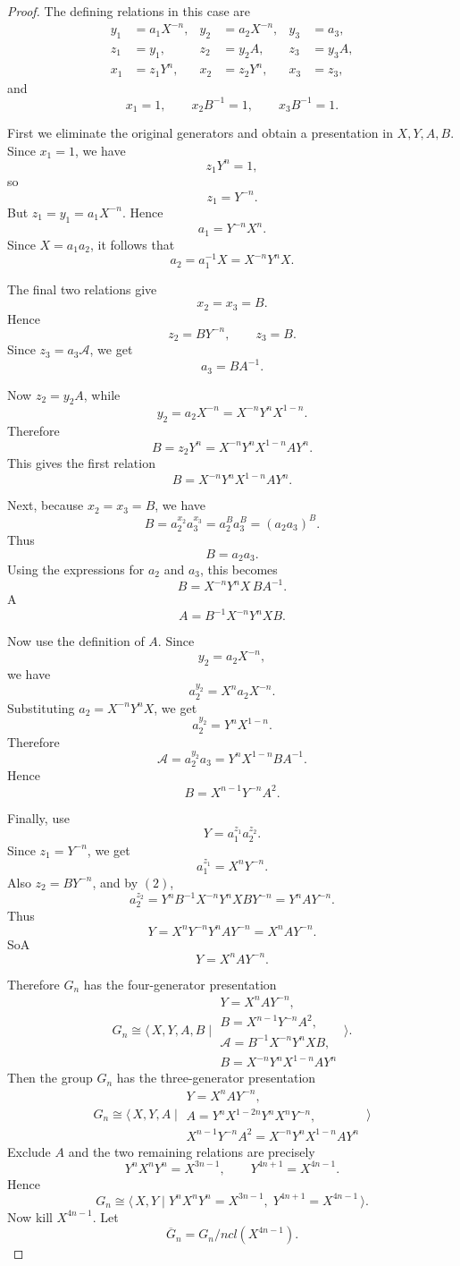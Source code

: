 \documentclass{article}
\newcommand{\gp}[2]{\langle\, #1 \mid #2 \,\rangle}
\begin{document}
\begin{proof}

The defining relations in this case are
\[
\begin{aligned}
y_1&=a_1X^{-n},& y_2&=a_2X^{-n},& y_3&=a_3,\\
z_1&=y_1,& z_2&=y_2A,& z_3&=y_3 A,\\
x_1&=z_1Y^n,& x_2&=z_2Y^n,& x_3&=z_3,
\end{aligned}
\]
and
\[
x_1=1,\qquad x_2B^{-1}=1,\qquad x_3B^{-1}=1.
\]

First we eliminate the original generators and obtain a presentation in
\(X,Y, A,B\).  Since \(x_1=1\), we have
\[
z_1Y^n=1,
\]
so
\[
z_1=Y^{-n}.
\]
But \(z_1=y_1=a_1X^{-n}\).  Hence
\[
a_1=Y^{-n}X^n.
\]
Since \(X=a_1a_2\), it follows that
\[
a_2=a_1^{-1}X=X^{-n}Y^nX.
\]

The final two relations give
\[
x_2=x_3=B.
\]
Hence
\[
z_2=BY^{-n},\qquad z_3=B.
\]
Since \(z_3=a_3\mathcal A\), we get
\[
a_3=B A^{-1}.
\]

Now \(z_2=y_2A\), while
\[
y_2=a_2X^{-n}=X^{-n}Y^nX^{1-n}.
\]
Therefore
\[
B=z_2Y^n
  =X^{-n}Y^nX^{1-n}A Y^n.
\]
This gives the first relation
\[
B=X^{-n}Y^nX^{1-n}A Y^n. \tag{1}
\]

Next, because \(x_2=x_3=B\), we have
\[
B=a_2^{x_2}a_3^{x_3}
  =a_2^B a_3^B
  =(a_2a_3)^B.
\]
Thus
\[
B=a_2a_3.
\]
Using the expressions for \(a_2\) and \(a_3\), this becomes
\[
B=X^{-n}Y^nX\,BA^{-1}.
\]
A\[
A=B^{-1}X^{-n}Y^nXB. \tag{2}
\]

Now use the definition of \(A\).  Since
\[
y_2=a_2X^{-n},
\]
we have
\[
a_2^{y_2}=X^na_2X^{-n}.
\]
Substituting \(a_2=X^{-n}Y^nX\), we get
\[
a_2^{y_2}=Y^nX^{1-n}.
\]
Therefore
\[
\mathcal A=a_2^{y_2}a_3
          =Y^nX^{1-n}B A^{-1}.
\]
Hence
\[
B=X^{n-1}Y^{-n} A^2. \tag{3}
\]

Finally, use
\[
Y=a_1^{z_1}a_2^{z_2}.
\]
Since \(z_1=Y^{-n}\), we get
\[
a_1^{z_1}=X^nY^{-n}.
\]
Also \(z_2=BY^{-n}\), and by \((2)\),
\[
a_2^{z_2}
=
Y^nB^{-1}X^{-n}Y^nXBY^{-n}
=
Y^nA Y^{-n}.
\]
Thus
\[
Y=X^nY^{-n}Y^n A Y^{-n}
 =X^nA Y^{-n}.
\]
SoA
\[
Y=X^n A Y^{-n}. \tag{4}
\]

Therefore \(G_n\) has the four-generator presentation
\[
G_n\cong
\gp{X,Y,A,B}{
\begin{array}{l}
Y=X^nA Y^{-n},\\
B=X^{n-1}Y^{-n}A^2,\\
\mathcal A=B^{-1}X^{-n}Y^nXB,\\
B=X^{-n}Y^nX^{1-n} A Y^n
\end{array}
}.
\]
Then the group \(G_n\) has the three-generator presentation
\[
G_n\cong
\gp{X,Y,A}{
\begin{array}{l}
Y=X^nAY^{-n},\\[2mm]
A=Y^nX^{1-2n}Y^nX^nY^{-n},\\[2mm]
X^{n-1}Y^{-n}A^2=X^{-n}Y^nX^{1-n}AY^n
\end{array}}\] 
Exclude $A $ and the two remaining relations are precisely
\[
Y^nX^nY^n=X^{3n-1},
\qquad
Y^{4n+1}=X^{4n-1}.
\]
Hence
\[
G_n\cong
\gp{X,Y}{
Y^nX^nY^n=X^{3n-1},\;
Y^{4n+1}=X^{4n-1}
}.
\]
Now kill \(X^{4n-1}\).  Let
\[
\overline G_n=G_n/ncl(X^{4n-1}).
\]


\end{proof}
\end{document}

